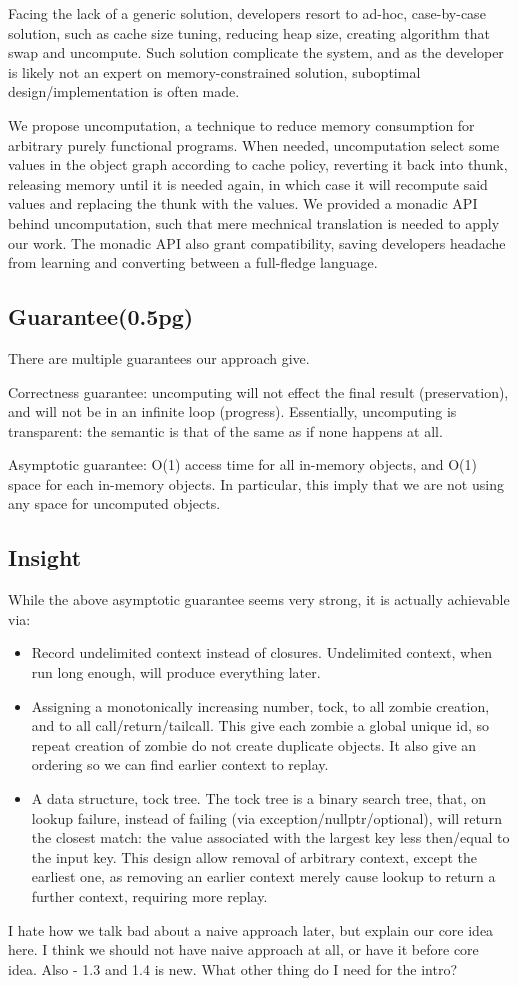 Facing the lack of a generic solution, developers resort to ad-hoc, case-by-case solution, such as cache size tuning, reducing heap size, creating algorithm that swap and uncompute. Such solution complicate the system, and as the developer is likely not an expert on memory-constrained solution, suboptimal design/implementation is often made.

We propose uncomputation, a technique to reduce memory consumption for arbitrary purely functional programs. When needed, uncomputation select some values in the object graph according to cache policy, reverting it back into thunk, releasing memory until it is needed again, in which case it will recompute said values and replacing the thunk with the values. We provided a monadic API behind uncomputation, such that mere mechnical translation is needed to apply our work. The monadic API also grant compatibility, saving developers headache from learning and converting between a full-fledge language.

\subsection{Guarantee(0.5pg)}
There are multiple guarantees our approach give.

Correctness guarantee: uncomputing will not effect the final result (preservation), and will not be in an infinite loop (progress). Essentially, uncomputing is transparent: the semantic is that of the same as if none happens at all.

Asymptotic guarantee: O(1) access time for all in-memory objects, and O(1) space for each in-memory objects. In particular, this imply that we are not using any space for uncomputed objects.

\subsection{Insight}
While the above asymptotic guarantee seems very strong, it is actually achievable via:

\begin{itemize}
	\item Record undelimited context instead of closures. Undelimited context, when run long enough, will produce everything later.
	\item Assigning a monotonically increasing number, tock, to all zombie creation, and to all call/return/tailcall. This give each zombie a global unique id, so repeat creation of zombie do not create duplicate objects. It also give an ordering so we can find earlier context to replay.
	\item A data structure, tock tree. The tock tree is a binary search tree, that, on lookup failure, instead of failing (via exception/nullptr/optional), will return the closest match: the value associated with the largest key less then/equal to the input key. This design allow removal of arbitrary context, except the earliest one, as removing an earlier context merely cause lookup to return a further context, requiring more replay.
\end{itemize}

\pavel I hate how we talk bad about a naive approach later, but explain our core idea here. I think we should not have naive approach at all, or have it before core idea. Also - 1.3 and 1.4 is new. What other thing do I need for the intro?